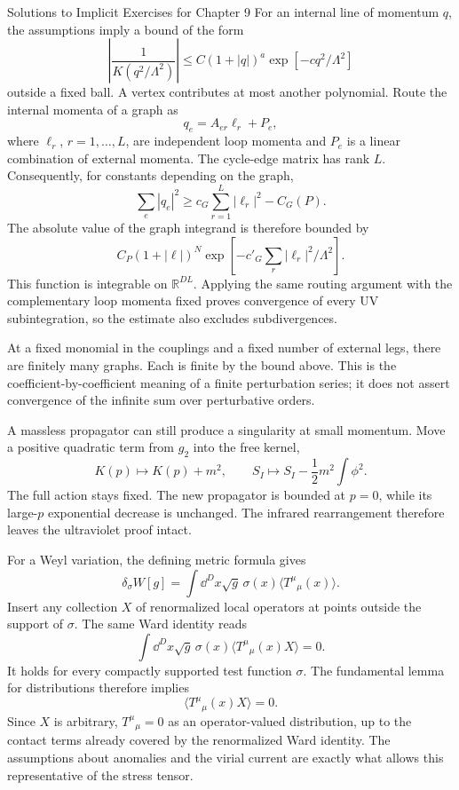 \begin{bankssolutions}{Solutions to Implicit Exercises for Chapter 9}
For an internal line of momentum $q$, the assumptions imply a bound of the
form
\[
  \left|\frac1{K(q^2/\Lambda^2)}\right|
  \leq C(1+|q|)^a\exp[-c q^2/\Lambda^2]
\]
outside a fixed ball.  A vertex contributes at most another polynomial.  Route
the internal momenta of a graph as
\[
  q_e=A_{er}\ell_r+P_e,
\]
where $\ell_r$, $r=1,\ldots,L$, are independent loop momenta and $P_e$ is a
linear combination of external momenta.  The cycle-edge matrix has rank $L$.
Consequently, for constants depending on the graph,
\[
  \sum_e|q_e|^2\geq c_G\sum_{r=1}^L|\ell_r|^2-C_G(P).
\]
The absolute value of the graph integrand is therefore bounded by
\[
  C_P(1+|\ell|)^N
  \exp\!\left[-c'_G\sum_r|\ell_r|^2/\Lambda^2\right].
\]
This function is integrable on $\mathbb R^{DL}$.  Applying the same routing
argument with the complementary loop momenta fixed proves convergence of
every UV subintegration, so the estimate also excludes subdivergences.

At a fixed monomial in the couplings and a fixed number of external legs,
there are finitely many graphs.  Each is finite by the bound above.  This is
the coefficient-by-coefficient meaning of a finite perturbation series; it
does not assert convergence of the infinite sum over perturbative orders.

A massless propagator can still produce a singularity at small momentum.
Move a positive quadratic term from $g_2$ into the free kernel,
\[
  K(p)\longmapsto K(p)+m^2,
  \qquad S_I\longmapsto S_I-\frac12m^2\int\phi^2.
\]
The full action stays fixed.  The new propagator is bounded at $p=0$, while
its large-$p$ exponential decrease is unchanged.  The infrared rearrangement
therefore leaves the ultraviolet proof intact.

For a Weyl variation, the defining metric formula gives
\[
  \delta_\sigma W[g]
  =\int\dd^D x\sqrt g\,\sigma(x)
  \langle T^\mu{}_{\mu}(x)\rangle.
\]
Insert any collection $X$ of renormalized local operators at points outside
the support of $\sigma$.  The same Ward identity reads
\[
  \int\dd^D x\sqrt g\,\sigma(x)
  \langle T^\mu{}_{\mu}(x)X\rangle=0.
\]
It holds for every compactly supported test function $\sigma$.  The
fundamental lemma for distributions therefore implies
\[
  \langle T^\mu{}_{\mu}(x)X\rangle=0.
\]
Since $X$ is arbitrary, $T^\mu{}_{\mu}=0$ as an operator-valued distribution,
up to the contact terms already covered by the renormalized Ward identity.
The assumptions about anomalies and the virial current are exactly what
allows this representative of the stress tensor.


\end{bankssolutions}
